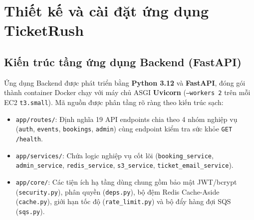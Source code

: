 \chapter[Thiết kế và cài đặt ứng dụng]{Thiết kế và cài đặt ứng dụng TicketRush}

\section{Kiến trúc tầng ứng dụng Backend (FastAPI)}
Ứng dụng Backend được phát triển bằng \textbf{Python 3.12} và \textbf{FastAPI}, đóng gói thành container Docker chạy với máy chủ ASGI \textbf{Uvicorn} (\texttt{--workers 2} trên mỗi EC2 \texttt{t3.small}). Mã nguồn được phân tầng rõ ràng theo kiến trúc sạch:
\begin{itemize}[leftmargin=1.5em]
  \item \texttt{app/routes/}: Định nghĩa 19 API endpoints chia theo 4 nhóm nghiệp vụ (\texttt{auth}, \texttt{events}, \texttt{bookings}, \texttt{admin}) cùng endpoint kiểm tra sức khỏe \texttt{GET /health}.
  \item \texttt{app/services/}: Chứa logic nghiệp vụ cốt lõi (\texttt{booking\_service}, \texttt{admin\_service}, \texttt{redis\_service}, \texttt{s3\_service}, \texttt{ticket\_email\_service}).
  \item \texttt{app/core/}: Các tiện ích hạ tầng dùng chung gồm bảo mật JWT/bcrypt (\texttt{security.py}), phân quyền (\texttt{deps.py}), bộ đệm Redis Cache-Aside (\texttt{cache.py}), giới hạn tốc độ (\texttt{rate\_limit.py}) và bộ đẩy hàng đợi SQS (\texttt{sqs.py}).
\end{itemize}

